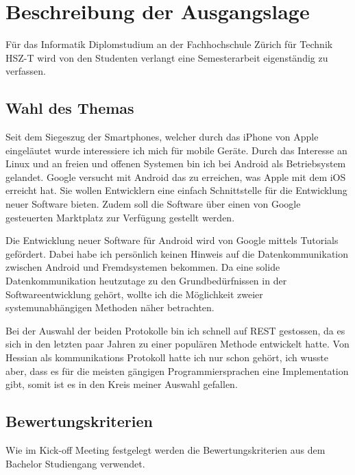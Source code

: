 \documentclass[listof=totocnumbered, bibliography=totocnumbered]{scrreprt}
\begin{document}
  
  \section{Beschreibung der Ausgangslage}
  
  Für das Informatik Diplomstudium an der Fachhochschule Zürich für Technik
  HSZ-T wird von den Studenten verlangt eine Semesterarbeit eigenständig zu
  verfassen.
  
  \subsection{Wahl des Themas}
  
  Seit dem Siegeszug der Smartphones, welcher durch das iPhone von Apple
  eingeläutet wurde interessiere ich mich für mobile Geräte. Durch das
  Interesse an Linux und an freien und offenen Systemen bin ich bei Android als
  Betriebsystem gelandet. Google versucht mit Android das zu erreichen, was
  Apple mit dem iOS erreicht hat. Sie wollen Entwicklern eine einfach
  Schnittstelle für die Entwicklung neuer Software bieten. Zudem soll die
  Software über einen von Google gesteuerten Marktplatz zur Verfügung gestellt
  werden.
  
  Die Entwicklung neuer Software für Android wird von Google mittels Tutorials
  gefördert. Dabei habe ich persönlich keinen Hinweis auf die Datenkommunikation
  zwischen Android und Fremdsystemen bekommen. Da eine solide
  Datenkommunikation heutzutage zu den Grundbedürfnissen in der
  Softwareentwicklung gehört, wollte ich die Möglichkeit zweier
  systemunabhängigen Methoden näher betrachten.
  
  Bei der Auswahl der beiden Protokolle bin ich schnell auf \ac{REST} gestossen,
  da es sich in den letzten paar Jahren zu einer populären Methode entwickelt
  hatte. Von Hessian als kommunikations Protokoll hatte ich nur schon gehört,
  ich wusste aber, dass es für die meisten gängigen Programmiersprachen eine
  Implementation gibt, somit ist es in den Kreis meiner Auswahl gefallen.
  
  
  \subsection{Bewertungskriterien}
  
  Wie im Kick-off Meeting festgelegt werden die Bewertungskriterien aus dem
  Bachelor Studiengang verwendet. 
  
\end{document}
